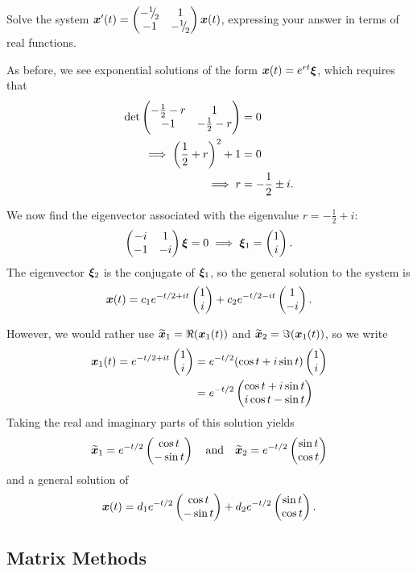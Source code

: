 \begin{eg}
	Solve the system $\bm{x}'(t) = \begin{pmatrix}-{}^{1}{\mskip -5mu/\mskip -3mu}_{2} & 1 \\ -1 & -{}^{1}{\mskip -5mu/\mskip -3mu}_{2}\end{pmatrix} \bm{x}(t)$, expressing your answer in terms of real functions.
	
	As before, we see exponential solutions of the form $\bm{x}(t) = e^{rt} \bm{\xi}$, which requires that
	\begin{align*}
		\det \begin{pmatrix}-\frac12 -r & 1 \\ -1 & -\frac12 -r\end{pmatrix} &= 0 \\
		\implies \left(\frac12 + r\right)^2 + 1 &= 0 \\
		\implies r &= -\frac12 \pm i.
	\end{align*}
	
	We now find the eigenvector associated with the eigenvalue $r = -\frac12 + i$:
	\[
	\begin{pmatrix}-i & 1 \\ -1 & -i\end{pmatrix}\bm{\xi} = 0 \implies \bm{\xi}_1 = \begin{pmatrix}1 \\ i\end{pmatrix}.
	\]
	The eigenvector $\bm{\xi}_2$ is the conjugate of $\bm{\xi}_1$, so the general solution to the system is
	\[
	\bm{x}(t) = c_1 e^{-t/2 + it}\begin{pmatrix}1 \\ i\end{pmatrix} + c_2 e^{-t/2 - it}\begin{pmatrix}1 \\ -i\end{pmatrix}.
	\]
	
	However, we would rather use $\widetilde{\bm{x}}_1 = \Re(\bm{x}_1(t))$ and $\widetilde{\bm{x}}_2 = \Im(\bm{x}_1(t))$, so we write
	\begin{align*}
		\bm{x}_1(t) = e^{-t/2 + it}\begin{pmatrix}1 \\ i\end{pmatrix} &= e^{-t/2}(\cos t + i\sin t)\begin{pmatrix}1 \\ i\end{pmatrix} \\
		&= e^{-t/2}\begin{pmatrix}\cos t + i\sin t \\ i\cos t -\sin t\end{pmatrix}
	\end{align*}
	Taking the real and imaginary parts of this solution yields
	\[
	\widetilde{\bm{x}}_1 = e^{-t/2}\begin{pmatrix}\cos t \\ -\sin t\end{pmatrix} \quad\text{and}\quad \widetilde{\bm{x}}_2 = e^{-t/2}\begin{pmatrix}\sin t \\ \cos t\end{pmatrix}
	\]
	and a general solution of
	\[
	\bm{x}(t) = d_1 e^{-t/2}\begin{pmatrix}\cos t \\ -\sin t\end{pmatrix} + d_2 e^{-t/2}\begin{pmatrix}\sin t \\ \cos t\end{pmatrix}.
	\]
\end{eg}


\subsection{Matrix Methods}

